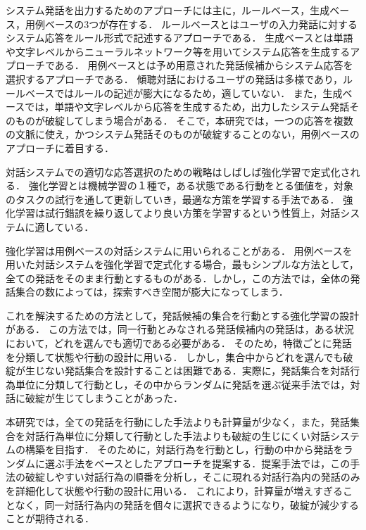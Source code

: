 \documentclass[12pt,a4paper,twoside,openany]{jbook}
\begin{document}
システム発話を出力するためのアプローチには主に，ルールベース，生成ベース，用例ベースの3つが存在する\cite{python}．
ルールベースとはユーザの入力発話に対するシステム応答をルール形式で記述するアプローチである．
生成ベースとは単語や文字レベルからニューラルネットワーク等を用いてシステム応答を生成するアプローチである．
用例ベースとは予め用意された発話候補からシステム応答を選択するアプローチである．
傾聴対話におけるユーザの発話は多様であり，ルールベースではルールの記述が膨大になるため，適していない．
また，生成ベースでは，単語や文字レベルから応答を生成するため，出力したシステム発話そのものが破綻してしまう場合がある．
そこで，本研究では，一つの応答を複数の文脈に使え，かつシステム発話そのものが破綻することのない，用例ベースのアプローチに着目する．

対話システムでの適切な応答選択のための戦略はしばしば強化学習で定式化される．
強化学習とは機械学習の１種で，ある状態である行動をとる価値を，対象のタスクの試行を通して更新していき，最適な方策を学習する手法である．
強化学習は試行錯誤を繰り返してより良い方策を学習するという性質上，対話システムに適している．

強化学習は用例ベースの対話システムに用いられることがある．
用例ベースを用いた対話システムを強化学習で定式化する場合，最もシンプルな方法として，全ての発話をそのまま行動とするものがある．しかし，この方法では，全体の発話集合の数によっては，探索すべき空間が膨大になってしまう．

これを解決するための方法として，発話候補の集合を行動とする強化学習の設計がある．
この方法では，同一行動とみなされる発話候補内の発話は，ある状況において，どれを選んでも適切である必要がある．
そのため，特徴ごとに発話を分類して状態や行動の設計に用いる．
しかし，集合中からどれを選んでも破綻が生じない発話集合を設計することは困難である．実際に，発話集合を対話行為単位に分類して行動とし，その中からランダムに発話を選ぶ従来手法\cite{nishimoto2}では，対話に破綻が生じてしまうことがあった．



本研究では，全ての発話を行動にした手法よりも計算量が少なく，また，発話集合を対話行為単位に分類して行動とした手法よりも破綻の生じにくい対話システムの構築を目指す．
そのために，対話行為を行動とし，行動の中から発話をランダムに選ぶ手法\cite{nishimoto2}をベースとしたアプローチを提案する．提案手法では，この手法の破綻しやすい対話行為の順番を分析し，そこに現れる対話行為内の発話のみを詳細化して状態や行動の設計に用いる．
これにより，計算量が増えすぎることなく，同一対話行為内の発話を個々に選択できるようになり，破綻が減少することが期待される．
\end{document}
